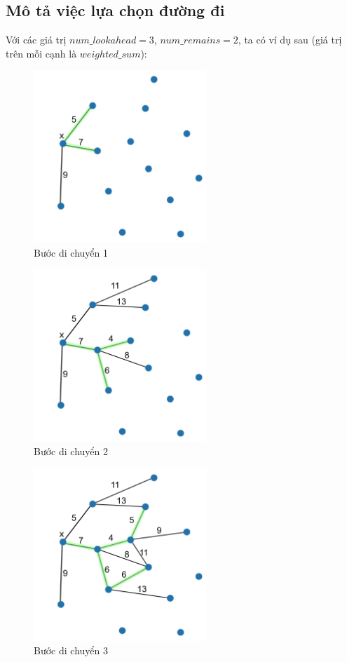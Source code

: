 \documentclass[12pt]{report}
\begin{document}
\subsection{Mô tả việc lựa chọn đường đi}
Với các giá trị $num\_lookahead = 3$, $num\_remains = 2$, ta có ví dụ sau (giá trị trên mỗi cạnh là $weighted\_sum$): 

\begin{figure}[H]
\caption{Bước di chuyển 1}
\centering
\includegraphics[width=6.5cm]{step-1.png}
\end{figure}

\begin{figure}[H]
\caption{Bước di chuyển 2}
\centering
\includegraphics[width=6.5cm]{step-2.png}
\end{figure}

\begin{figure}[H]
\caption{Bước di chuyển 3}
\centering
\includegraphics[width=6.5cm]{step-3.png}
\end{figure}
\end{document}
